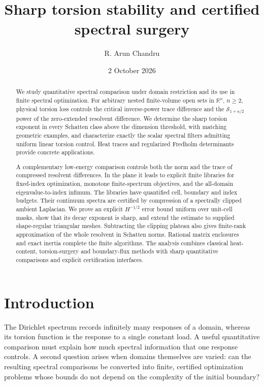 \documentclass[11pt,reqno]{amsart}
\title[Sharp torsion stability and certified spectral surgery]{Sharp torsion stability and certified spectral surgery}
\author{R. Arun Chandru}
\date{2 October 2026}
\numberwithin{equation}{section}
\newcommand{\R}{\mathbb R}
\begin{document}
\begin{abstract}
We study quantitative spectral comparison under domain restriction and
its use in finite spectral optimization. For arbitrary nested
finite-volume open sets in \(\R^n\), \(n\ge2\), physical torsion loss
controls the critical inverse-power trace difference and the
\(\mathcal S_{1+n/2}\) power of the zero-extended resolvent difference.
We determine the sharp torsion exponent in every Schatten class above
the dimension threshold, with matching geometric examples, and
characterize exactly the scalar spectral filters admitting uniform
linear torsion control. Heat traces and regularized Fredholm
determinants provide concrete applications.

A complementary low-energy comparison controls both the norm and the
trace of compressed resolvent differences. In the plane it leads to
explicit finite libraries for fixed-index optimization, monotone
finite-spectrum objectives, and the all-domain eigenvalue-to-index
infimum. The libraries have quantified cell, boundary and index
budgets. Their continuum spectra are certified by compression of a
spectrally clipped ambient Laplacian. We prove an explicit
\(H^{-1/2}\) error bound uniform over unit-cell masks, show that its
decay exponent is sharp, and extend the estimate to supplied
shape-regular triangular meshes. Subtracting the clipping plateau
also gives finite-rank approximation of the whole resolvent in
Schatten norms. Rational matrix enclosures and exact inertia complete
the finite algorithms. The analysis combines classical heat-content,
torsion-surgery and boundary-flux methods with sharp quantitative
comparisons and explicit certification interfaces.
\end{abstract}
\maketitle
\tableofcontents
\clearpage

\section{Introduction}\label{sec:introduction}

The Dirichlet spectrum records infinitely many responses of a domain,
whereas its torsion function is the response to a single constant
load. A useful quantitative comparison must explain how much spectral
information that one response controls. A second question arises when
domains themselves are varied: can the resulting spectral comparisons
be converted into finite, certified optimization problems whose bounds
do not depend on the complexity of the initial boundary?
\end{document}
